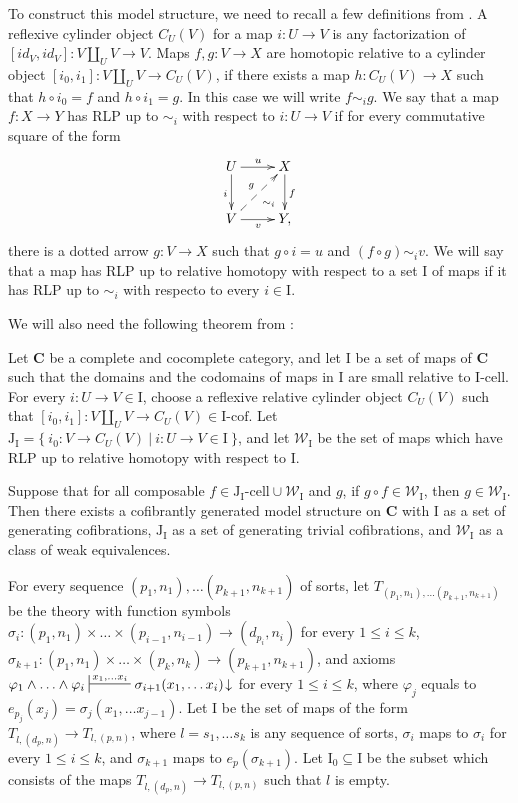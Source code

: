 \documentclass[reqno]{amsart}
\theoremstyle{definition}
\theoremstyle{remark}
\newcommand{\cat}[1]{\mathbf{#1}}
\newcommand{\C}{\cat{C}}
\newcommand{\we}{\mathcal{W}}
\newcommand{\I}{\mathrm{I}}
\newcommand{\J}{\mathrm{J}}
\newcommand{\class}[2]{#1\text{-}\mathrm{#2}}
\newcommand{\Icell}[1][\I]{\class{#1}{cell}}
\newcommand{\Icof}[1][\I]{\class{#1}{cof}}
\newcommand{\Jcell}[1][]{\Icell[\J#1]}
\newcommand{\cyli}{i}
\numberwithin{figure}{section}
\begin{document}
To construct this model structure, we need to recall a few definitions from \cite{f-model-structures}.
A reflexive cylinder object $C_U(V)$ for a map $i : U \to V$ is any factorization of $[id_V,id_V] : V \amalg_U V \to V$.
Maps $f,g : V \to X$ are homotopic relative to a cylinder object $[\cyli_0,\cyli_1] : V \amalg_U V \to C_U(V)$, if there exists a map $h : C_U(V) \to X$
such that $h \circ \cyli_0 = f$ and $h \circ \cyli_1 = g$.
In this case we will write $f \sim_i g$.
We say that a map $f : X \to Y$ has RLP up to $\sim_i$ with respect to $i : U \to V$ if for every commutative square of the form
\[ \xymatrix{ U \ar[r]^u \ar@{}[dr]|(.7){\sim_i} \ar[d]_i & X \ar[d]^f \\
              V \ar[r]_v \ar@{-->}[ur]^g                  & Y,
            } \]
there is a dotted arrow $g : V \to X$ such that $g \circ i = u$ and $(f \circ g) \sim_i v$.
We will say that a map has RLP up to relative homotopy with respect to a set $\I$ of maps if it has RLP up to $\sim_i$ with respecto to every $i \in \I$.

We will also need the following theorem from \cite{f-model-structures}:
\begin{thm}
Let $\C$ be a complete and cocomplete category, and let $\I$ be a set of maps of $\C$
such that the domains and the codomains of maps in $\I$ are small relative to $\Icell$.
For every $i : U \to V \in \I$, choose a reflexive relative cylinder object $C_U(V)$
such that $[\cyli_0,\cyli_1] : V \amalg_U V \to C_U(V) \in \Icof$.
Let $\J_\I = \{\ \cyli_0 : V \to C_U(V)\ |\ i : U \to V \in \I \ \}$, and
let $\we_\I$ be the set of maps which have RLP up to relative homotopy with respect to $\I$.

Suppose that for all composable $f \in \Jcell[_\I] \cup \we_\I$ and $g$, if $g \circ f \in \we_\I$, then $g \in \we_\I$.
Then there exists a cofibrantly generated model structure on $\C$ with $\I$ as a set of generating cofibrations,
$\J_\I$ as a set of generating trivial cofibrations, and $\we_\I$ as a class of weak equivalences.
\end{thm}

For every sequence $(p_1,n_1), \ldots (p_{k+1},n_{k+1})$ of sorts, let $T_{(p_1,n_1), \ldots (p_{k+1},n_{k+1})}$ be the theory
with function symbols $\sigma_i : (p_1,n_1) \times \ldots \times (p_{i-1},n_{i-1}) \to (d_{p_i},n_i)$ for every $1 \leq i \leq k$,
$\sigma_{k+1} : (p_1,n_1) \times \ldots \times (p_k,n_k) \to (p_{k+1},n_{k+1})$,
and axioms $\varphi_1 \land \ldots \land \varphi_i \sststile{}{x_1, \ldots x_i} \sigma_{i+1}(x_1, \ldots x_i)\!\downarrow$ for every $1 \leq i \leq k$,
where $\varphi_j$ equals to $e_{p_j}(x_j) = \sigma_j(x_1, \ldots x_{j-1})$.
Let $\I$ be the set of maps of the form $T_{l, (d_p,n)} \to T_{l, (p,n)}$, where $l = s_1, \ldots s_k$ is any sequence of sorts,
$\sigma_i$ maps to $\sigma_i$ for every $1 \leq i \leq k$, and $\sigma_{k+1}$ maps to $e_p(\sigma_{k+1})$.
Let $\I_0 \subseteq \I$ be the subset which consists of the maps $T_{l, (d_p,n)} \to T_{l, (p,n)}$ such that $l$ is empty.
\end{document}
